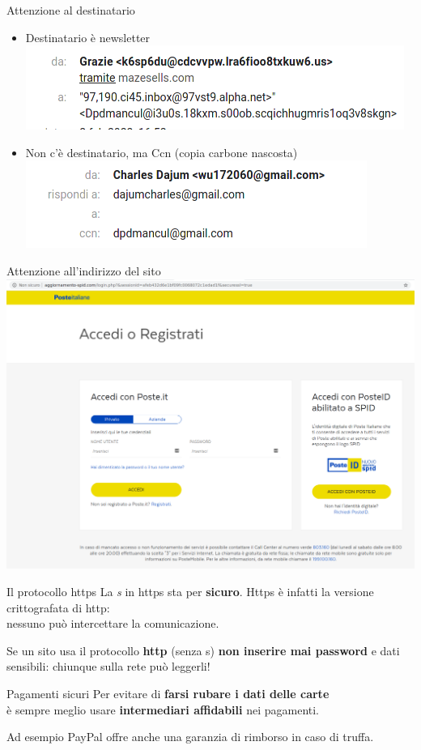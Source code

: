 \begin{myframe}{Attenzione al destinatario}
  \begin{itemize}[<+->]
    \item Destinatario è newsletter \\
      \includegraphics[width=.5\textwidth]{img/phishing/destinatario}
    \item Non c'è destinatario, ma Ccn (copia carbone nascosta) \\
      \includegraphics[width=.5\textwidth]{img/phishing/ccn}
  \end{itemize}
\end{myframe}

\begin{myframe}{Attenzione all'indirizzo del sito}
  \includegraphics[width=.8\textwidth]{img/phishing/url}
\end{myframe}

\begin{myframe}{Il protocollo https}
  La \emph{s} in https sta per \textbf{sicuro}. Https è infatti la versione crittografata di http:\\nessuno può intercettare la comunicazione.

  \medskip\pause
  Se un sito usa il protocollo \textbf{http} (senza s) \textbf{non inserire mai password} e dati sensibili: chiunque sulla rete può leggerli!
\end{myframe}

\begin{myframe}{Pagamenti sicuri}
  Per evitare di \textbf{farsi rubare i dati delle carte}\\è sempre meglio usare \textbf{intermediari affidabili} nei pagamenti.

  \pause\bigskip
  Ad esempio PayPal offre anche una garanzia di rimborso in caso di truffa.
\end{myframe}

